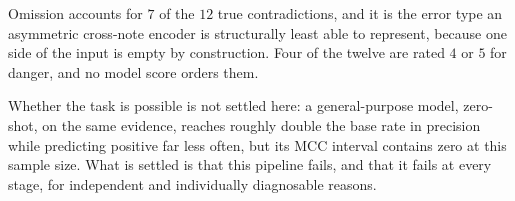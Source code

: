 Omission accounts for $7$ of the $12$ true contradictions, and it is the error
type an asymmetric cross-note encoder is structurally least able to represent,
because one side of the input is empty by construction. Four of the twelve are
rated $4$ or $5$ for danger, and no model score orders them.

Whether the task is possible is not settled here: a general-purpose model,
zero-shot, on the same evidence, reaches roughly double the base rate in
precision while predicting positive far less often, but its MCC interval contains
zero at this sample size. What is settled is that this pipeline fails, and that
it fails at every stage, for independent and individually diagnosable reasons.
